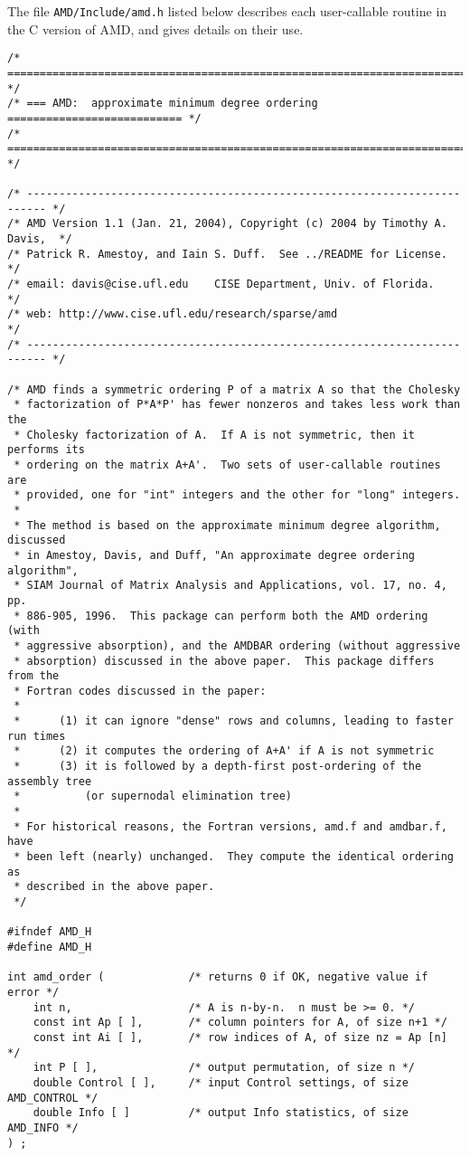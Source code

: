 \documentclass[11pt]{article}
\begin{document}
The file {\tt AMD/Include/amd.h} listed below
describes each user-callable routine in the C version of AMD,
and gives details on their use.

{\footnotesize
\begin{verbatim}
/* ========================================================================= */
/* === AMD:  approximate minimum degree ordering =========================== */
/* ========================================================================= */

/* ------------------------------------------------------------------------- */
/* AMD Version 1.1 (Jan. 21, 2004), Copyright (c) 2004 by Timothy A. Davis,  */
/* Patrick R. Amestoy, and Iain S. Duff.  See ../README for License.         */
/* email: davis@cise.ufl.edu    CISE Department, Univ. of Florida.           */
/* web: http://www.cise.ufl.edu/research/sparse/amd                          */
/* ------------------------------------------------------------------------- */

/* AMD finds a symmetric ordering P of a matrix A so that the Cholesky
 * factorization of P*A*P' has fewer nonzeros and takes less work than the
 * Cholesky factorization of A.  If A is not symmetric, then it performs its
 * ordering on the matrix A+A'.  Two sets of user-callable routines are
 * provided, one for "int" integers and the other for "long" integers.
 *
 * The method is based on the approximate minimum degree algorithm, discussed
 * in Amestoy, Davis, and Duff, "An approximate degree ordering algorithm",
 * SIAM Journal of Matrix Analysis and Applications, vol. 17, no. 4, pp.
 * 886-905, 1996.  This package can perform both the AMD ordering (with
 * aggressive absorption), and the AMDBAR ordering (without aggressive
 * absorption) discussed in the above paper.  This package differs from the
 * Fortran codes discussed in the paper:
 *
 *      (1) it can ignore "dense" rows and columns, leading to faster run times
 *      (2) it computes the ordering of A+A' if A is not symmetric
 *      (3) it is followed by a depth-first post-ordering of the assembly tree
 *          (or supernodal elimination tree)
 *
 * For historical reasons, the Fortran versions, amd.f and amdbar.f, have
 * been left (nearly) unchanged.  They compute the identical ordering as
 * described in the above paper.
 */

#ifndef AMD_H
#define AMD_H

int amd_order (             /* returns 0 if OK, negative value if error */
    int n,                  /* A is n-by-n.  n must be >= 0. */
    const int Ap [ ],       /* column pointers for A, of size n+1 */
    const int Ai [ ],       /* row indices of A, of size nz = Ap [n] */
    int P [ ],              /* output permutation, of size n */
    double Control [ ],     /* input Control settings, of size AMD_CONTROL */
    double Info [ ]         /* output Info statistics, of size AMD_INFO */
) ;


\end{verbatim}}
\end{document}

